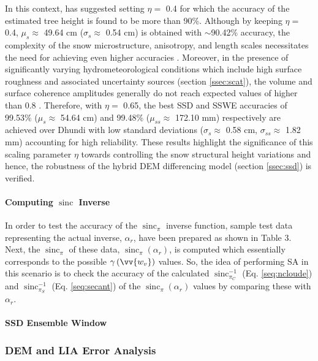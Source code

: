 \documentclass[review]{elsarticle}
\numberwithin{equation}{section}
\numberwithin{figure}{section}
\numberwithin{table}{section}
\DeclareMathOperator{\sinc}{sinc}
\begin{document}
In this context, \cite{Cloude2005} has suggested setting $\eta = $ 0.4 for which the accuracy of the estimated tree
height is found to be more than 90\%. Although by keeping $\eta = $ 0.4, $\mu_s \approx$ 49.64 cm ($\sigma_s \approx$ 0.54 cm) is obtained with $\sim$90.42\% accuracy, the complexity of the snow microstructure, anisotropy, and length scales necessitates the need for achieving even higher accuracies \citep{Leinss2016}. Moreover, in the presence of significantly varying hydrometeorological conditions which include high surface roughness and associated uncertainty sources (section \ref{ssec:scat}), the volume and surface coherence amplitudes generally do not reach expected values of higher than 0.8 \citep{Cloude2005, Kugler2015}. Therefore, with $\eta = $ 0.65, the best SSD and SSWE accuracies of 99.53\% ($\mu_s \approx$ 54.64 cm) and 99.48\% ($\mu_{ss} \approx$ 172.10 mm) respectively are achieved over Dhundi with low standard deviations ($\sigma_s \approx$ 0.58 cm, $\sigma_{ss} \approx$ 1.82 mm) accounting for high reliability. These results highlight the significance of this scaling parameter $\eta$ towards controlling the snow structural height variations \citep{Cloude2005, Cloude2010} and hence, the robustness of the hybrid DEM differencing model (section \ref{ssec:ssd}) is verified.

\paragraph*{Computing $\sinc$ Inverse}
In order to test the accuracy of the $\sinc_\pi$ inverse function, sample test data representing the actual inverse, $\alpha_r$, have been prepared as shown in Table 3. Next, the $\sinc_\pi$ of these data, $\sinc_{\pi}\left(\alpha_r\right)$, is computed which essentially corresponds to the possible $\gamma\left(\vv{w_v}\right)$ values. So, the idea of performing SA in this scenario is to check the accuracy of the calculated $\sinc_{\pi_C}^{-1}$ (Eq. \eqref{seq:ncloude}) and $\sinc_{\pi_S}^{-1}$ (Eq. \eqref{seq:secant}) of the $\sinc_{\pi}\left(\alpha_r\right)$ values by comparing these with $\alpha_r$.


\paragraph*{SSD Ensemble Window}

\subsubsection{DEM and LIA Error Analysis}
\label{sssec:error}
\end{document}
